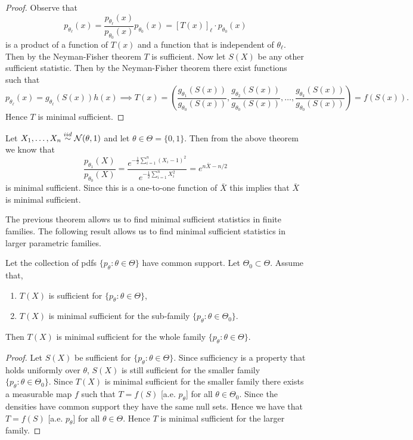 \begin{proof}
	Observe that \[
	p_{\theta_\ell}(x) = \frac{p_{\theta_\ell}(x)}{p_{\theta_0}(x)}p_{\theta_0}(x) = [T(x)]_\ell \cdot p_{\theta_0}(x)
	\] is a product of a function of $T(x)$ and a function that is independent of $\theta_\ell$. Then by the Neyman-Fisher theorem $T$ is sufficient. Now let $S(X)$ be any other sufficient statistic. Then by the Neyman-Fisher theorem there exist functions such that \[
	p_{\theta_\ell}(x) = g_{\theta_\ell}(S(x)) h(x) \implies T(x) = \left( \frac{g_{\theta_1}(S(x))}{g_{\theta_0}(S(x))}, \frac{g_{\theta_2}(S(x))}{g_{\theta_0}(S(x))}, \dots, \frac{g_{\theta_k}(S(x))}{g_{\theta_0}(S(x))} \right) = f(S(x)).
	\] Hence $T$ is minimal sufficient.
\end{proof}

\begin{example}
	Let $X_1, \dots, X_n \overset{iid}{\sim} \mathcal N(\theta, 1)$ and let $\theta \in \Theta = \{0, 1\}$. Then from the above theorem we know that \[
	\frac{p_{\theta_1}(X)}{p_{\theta_0}(X)} = \frac{e^{-\frac{1}{2}\sum_{i=1}^n (X_i - 1)^2}}{e^{-\frac{1}{2}\sum_{i=1}^n X_i^2}} = 
	e^{n \bar{X} - n/2}
	\] is minimal sufficient. Since this is a one-to-one function of $\bar{X}$ this implies that $\bar{X}$ is minimal sufficient.
\end{example}

\noindent The previous theorem allows us to find minimal sufficient statistics in finite families. The following result allows us to find minimal sufficient statistics in larger parametric families.

\begin{theorem}
	Let the collection of pdfs $\{p_\theta : \theta \in \Theta \}$ have common support. Let $\Theta_0 \subset \Theta$. Assume that, \begin{enumerate}[label=(\alph*)]
		\item $T(X)$ is sufficient for $\{p_\theta : \theta \in \Theta \}$,
		\item $T(X)$ is minimal sufficient for the sub-family $\{p_\theta : \theta \in \Theta_0 \}$.
	\end{enumerate}
	Then $T(X)$ is minimal sufficient for the whole family $\{p_\theta : \theta \in \Theta \}$.
\end{theorem}

\begin{proof}
	Let $S(X)$ be sufficient for $\{p_\theta : \theta \in \Theta \}$. Since sufficiency is a property that holds uniformly over $\theta$, $S(X)$ is still sufficient for the smaller family $\{p_\theta : \theta \in \Theta_0 \}$. Since $T(X)$ is minimal sufficient for the smaller family there exists a measurable map $f$ such that $T = f(S)$ [a.e. $p_\theta$] for all $\theta \in \Theta_0$. Since the densities have common support they have the same null sets. Hence we have that $T = f(S)$ [a.e. $p_\theta$] for all $\theta \in \Theta$. Hence $T$ is minimal sufficient for the larger family.
\end{proof}

